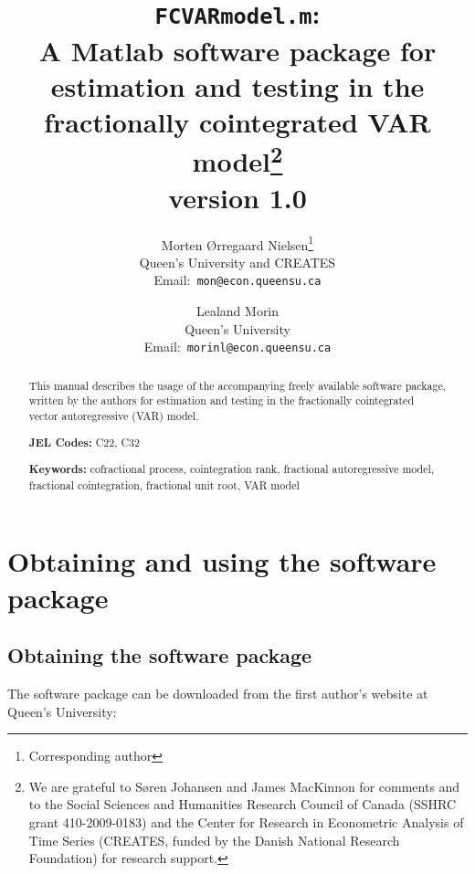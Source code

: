 \documentclass[12pt]{article}
\begin{document}
\title{\texttt{FCVARmodel.m}: \\A Matlab software package for estimation and testing in the fractionally cointegrated VAR model\thanks{
We are grateful to S\o ren Johansen and James MacKinnon for comments and to 
the Social Sciences and Humanities Research Council of Canada (SSHRC grant
410-2009-0183) and the Center for Research in Econometric
Analysis of Time Series (CREATES, funded by the Danish National Research
Foundation) for research support.}
\bigskip
\\version 1.0
\bigskip} 
\author{Morten \O rregaard Nielsen\thanks{Corresponding author} \\
Queen's University and CREATES \\
Email:\ \texttt{mon@econ.queensu.ca}
\and Lealand Morin \\
Queen's University \\
Email:\ \texttt{morinl@econ.queensu.ca}}


\maketitle

\begin{abstract}
This manual describes the usage of the accompanying freely available software package, written by the authors for estimation and testing in the fractionally cointegrated vector autoregressive (VAR) model.

\bigskip \bigskip \noindent \textbf{JEL Codes:} C22, C32

\medskip \noindent \textbf{Keywords:} cofractional process, cointegration rank, fractional autoregressive model, fractional cointegration, fractional unit root, VAR model

\end{abstract}

\newpage

\tableofcontents

\newpage

\section{Obtaining and using the software package\label{sec obtaining}}

\subsection{Obtaining the software package}

The software package can be downloaded from the first author's website at Queen's University:
\end{document}
